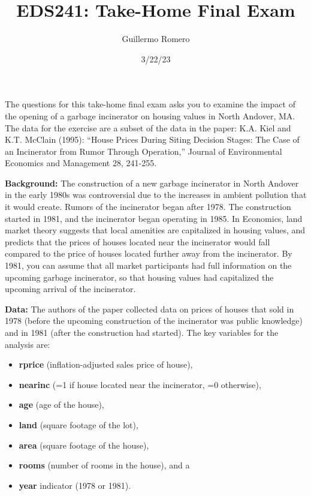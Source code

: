 \documentclass[
  letterpaper,
  DIV=11,
  numbers=noendperiod]{scrartcl}
\title{EDS241: Take-Home Final Exam}
\author{Guillermo Romero}
\date{3/22/23}
\begin{document}
\maketitle
\ifdefined\Shaded\renewenvironment{Shaded}{\begin{tcolorbox}[borderline west={3pt}{0pt}{shadecolor}, boxrule=0pt, interior hidden, frame hidden, breakable, enhanced, sharp corners]}{\end{tcolorbox}}\fi

The questions for this take-home final exam asks you to examine the
impact of the opening of a garbage incinerator on housing values in
North Andover, MA. The data for the exercise are a subset of the data in
the paper: K.A. Kiel and K.T. McClain (1995): ``House Prices During
Siting Decision Stages: The Case of an Incinerator from Rumor Through
Operation,'' Journal of Environmental Economics and Management 28,
241-255.

\textbf{Background:} The construction of a new garbage incinerator in
North Andover in the early 1980s was controversial due to the increases
in ambient pollution that it would create. Rumors of the incinerator
began after 1978. The construction started in 1981, and the incinerator
began operating in 1985. In Economics, land market theory suggests that
local amenities are capitalized in housing values, and predicts that the
prices of houses located near the incinerator would fall compared to the
price of houses located further away from the incinerator. By 1981, you
can assume that all market participants had full information on the
upcoming garbage incinerator, so that housing values had capitalized the
upcoming arrival of the incinerator.

\textbf{Data:} The authors of the paper collected data on prices of
houses that sold in 1978 (before the upcoming construction of the
incinerator was public knowledge) and in 1981 (after the construction
had started). The key variables for the analysis are:

\begin{itemize}
\item
  \textbf{rprice} (inflation-adjusted sales price of house),
\item
  \textbf{nearinc} (=1 if house located near the incinerator, =0
  otherwise),
\item
  \textbf{age} (age of the house),
\item
  \textbf{land} (square footage of the lot),
\item
  \textbf{area} (square footage of the house),
\item
  \textbf{rooms} (number of rooms in the house), and a
\item
  \textbf{year} indicator (1978 or 1981).
\end{itemize}
\end{document}
